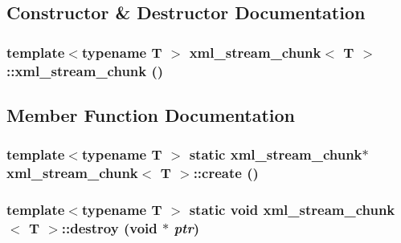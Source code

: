 \subsection{Constructor \& Destructor Documentation}
\hypertarget{structxml__stream__chunk_a8b87fcb2074014dd252f752a95092337}{
\subsubsection[{xml\_\-stream\_\-chunk}]{\setlength{\rightskip}{0pt plus 5cm}template$<$typename T $>$ {\bf xml\_\-stream\_\-chunk}$<$ T $>$::{\bf xml\_\-stream\_\-chunk} ()}}
\label{structxml__stream__chunk_a8b87fcb2074014dd252f752a95092337}


\subsection{Member Function Documentation}
\hypertarget{structxml__stream__chunk_a92cffe33c529ff266329fd4afb59226d}{
\subsubsection[{create}]{\setlength{\rightskip}{0pt plus 5cm}template$<$typename T $>$ static {\bf xml\_\-stream\_\-chunk}$\ast$ {\bf xml\_\-stream\_\-chunk}$<$ T $>$::create ()}}
\label{structxml__stream__chunk_a92cffe33c529ff266329fd4afb59226d}
\hypertarget{structxml__stream__chunk_a4b812901d59950d48d539e5c8726a0e8}{
\subsubsection[{destroy}]{\setlength{\rightskip}{0pt plus 5cm}template$<$typename T $>$ static void {\bf xml\_\-stream\_\-chunk}$<$ T $>$::destroy (void $\ast$ {\em ptr})}}
\label{structxml__stream__chunk_a4b812901d59950d48d539e5c8726a0e8}


